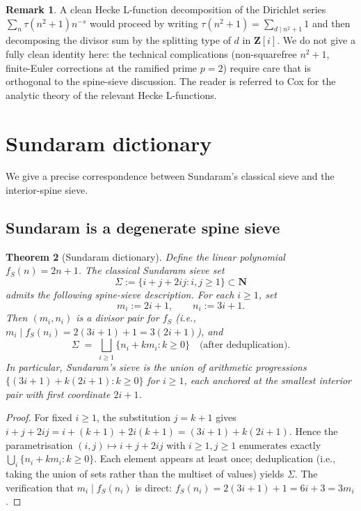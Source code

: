 \documentclass[11pt]{article}
\newtheorem{theorem}{Theorem}[section]
\theoremstyle{definition}
\newtheorem{remark}[theorem]{Remark}
\newcommand{\N}{\mathbf{N}}
\newcommand{\Z}{\mathbf{Z}}
\newcommand{\Zi}{\Z[i]}
\begin{document}
\begin{remark}\label{rem:hecke-honest}
A clean Hecke L-function decomposition of the Dirichlet series $\sum_n \tau(n^2+1) n^{-s}$ would proceed by writing $\tau(n^2+1) = \sum_{d \mid n^2+1} 1$ and then decomposing the divisor sum by the splitting type of $d$ in $\Zi$. We do not give a fully clean identity here: the technical complications (non-squarefree $n^2+1$, finite-Euler corrections at the ramified prime $p = 2$) require care that is orthogonal to the spine-sieve discussion. The reader is referred to Cox \cite{cox} for the analytic theory of the relevant Hecke L-functions.
\end{remark}

\section{Sundaram dictionary}\label{sec:sundaram}

We give a precise correspondence between Sundaram's classical sieve and the interior-spine sieve.

\subsection{Sundaram is a degenerate spine sieve}

\begin{theorem}[Sundaram dictionary]\label{thm:sundaram-dict}
Define the linear polynomial $f_S(n) = 2n+1$. The classical Sundaram sieve set
\[
\Sigma := \{i + j + 2ij : i,j \ge 1\} \subset \N
\]
admits the following spine-sieve description. For each $i \ge 1$, set
\[
m_i := 2i+1, \qquad n_i := 3i+1.
\]
Then $(m_i, n_i)$ is a divisor pair for $f_S$ (i.e., $m_i \mid f_S(n_i) = 2(3i+1)+1 = 3(2i+1)$), and
\[
\Sigma \;=\; \bigsqcup_{i \ge 1} \{n_i + k m_i : k \ge 0\} \quad \text{(after deduplication)}.
\]
In particular, Sundaram's sieve is the union of arithmetic progressions $\{(3i+1) + k(2i+1) : k \ge 0\}$ for $i \ge 1$, each anchored at the smallest interior pair with first coordinate $2i+1$.
\end{theorem}

\begin{proof}
For fixed $i \ge 1$, the substitution $j = k+1$ gives $i+j+2ij = i+(k+1)+2i(k+1) = (3i+1)+k(2i+1)$. Hence the parametrisation $(i,j) \mapsto i+j+2ij$ with $i \ge 1, j \ge 1$ enumerates exactly $\bigcup_i \{n_i + km_i : k \ge 0\}$. Each element appears at least once; deduplication (i.e., taking the union of sets rather than the multiset of values) yields $\Sigma$. The verification that $m_i \mid f_S(n_i)$ is direct: $f_S(n_i) = 2(3i+1)+1 = 6i+3 = 3 m_i$.
\end{proof}
\end{document}
